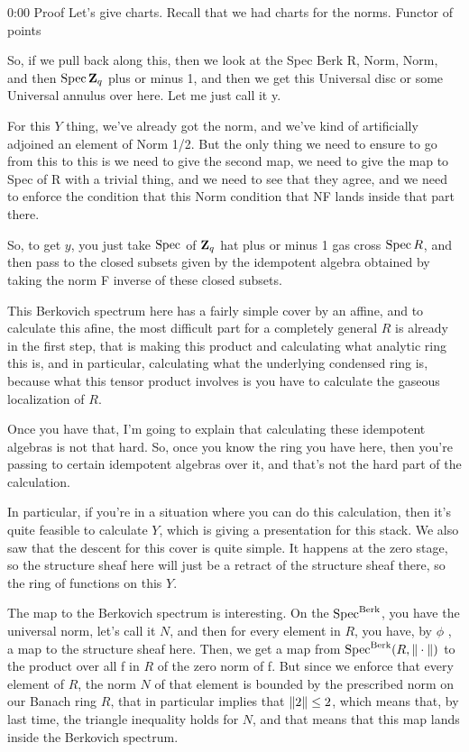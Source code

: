 \begin{unfinished}{0:00}
Proof
Let's give charts.
Recall that we had charts for the norms.
Functor of points

So, if we pull back along this, then we look at the Spec Berk R, Norm, Norm, and then $\operatorname{Spec} \mathbf Z_q$ plus or minus 1, and then we get this Universal disc or some Universal annulus over here. Let me just call it y.

For this $Y$ thing, we've already got the norm, and we've kind of artificially adjoined an element of Norm 1/2. But the only thing we need to ensure to go from this to this is we need to give the second map, we need to give the map to Spec of R with a trivial thing, and we need to see that they agree, and we need to enforce the condition that this Norm condition that NF lands inside that part there.

So, to get $y$, you just take $\operatorname{Spec}$ of $\mathbf Z_q$ hat plus or minus 1 gas cross $\operatorname{Spec} R$, and then pass to the closed subsets given by the idempotent algebra obtained by taking the norm F inverse of these closed subsets.

This Berkovich spectrum here has a fairly simple cover by an affine, and to calculate this afine, the most difficult part for a completely general $R$ is already in the first step, that is making this product and calculating what analytic ring this is, and in particular, calculating what the underlying condensed ring is, because what this tensor product involves is you have to calculate the gaseous localization of $R$.

Once you have that, I'm going to explain that calculating these idempotent algebras is not that hard. So, once you know the ring you have here, then you're passing to certain idempotent algebras over it, and that's not the hard part of the calculation.

In particular, if you're in a situation where you can do this calculation, then it's quite feasible to calculate $Y$, which is giving a presentation for this stack. We also saw that the descent for this cover is quite simple. It happens at the zero stage, so the structure sheaf here will just be a retract of the structure sheaf there, so the ring of functions on this $Y$.


The map to the Berkovich spectrum is interesting. On the $\operatorname{Spec}^{\mathrm{Berk}}$, you have the universal norm, let's call it $N$, and then for every element in $R$, you have, by $\phi$ , a map to the structure sheaf here. Then, we get a map from $\operatorname{Spec}^{\mathrm{Berk}} (R, \| \cdot \| )$ to the product over all f in $R$ of the zero norm of f.
But since we enforce that every element of $R$, the norm $N$ of that element is bounded by the prescribed norm on our Banach ring $R$, that in particular implies that $\| 2 \| \leq 2$, which means that, by last time, the triangle inequality holds for $N$, and that means that this map lands inside the Berkovich spectrum.


\end{unfinished}

